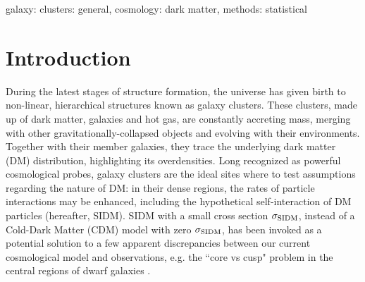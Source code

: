 \documentclass[usenatbib]{mn2e}
\newcommand{\sigmaSIDM}{\sigma_{\rm SIDM}}
\begin{document}
\begin{keywords}
	galaxy: clusters: general, cosmology: dark matter, methods: statistical 
\end{keywords}

\section{Introduction} 

During the latest stages of structure formation, the universe has given birth to
non-linear, hierarchical structures known as galaxy clusters. 
These clusters, made up of dark matter, galaxies and hot gas,
are constantly accreting mass, merging with other gravitationally-collapsed objects and evolving with their
environments. Together with their member galaxies, they trace the underlying dark matter (DM) 
distribution, highlighting its overdensities. 
%
Long recognized as powerful cosmological probes, galaxy clusters are the ideal sites where to test assumptions regarding the nature of DM: 
in their dense regions, the rates of particle
interactions may be enhanced, including the hypothetical self-interaction of DM
particles (hereafter, SIDM). SIDM with a small cross section
$\sigmaSIDM$, instead of a Cold-Dark Matter (CDM) model with zero $\sigma_{\rm
SIDM}$, has been invoked as a potential solution to a few apparent discrepancies between our current cosmological model and observations, e.g. the 
``core vs cusp" problem in the central regions of
dwarf galaxies \citep[see e.g.][and references therein]{Vogelsberger:2012b, Rocha:2013a, Vogelsberger:2014c}.\\
\end{document}
